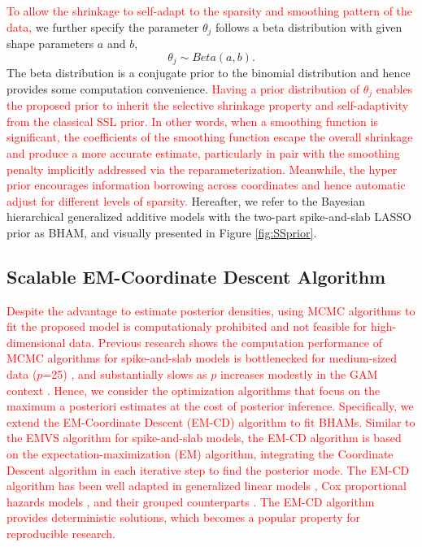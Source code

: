 \documentclass[AMA,STIX1COL,]{WileyNJD-v2}
\begin{document}
\textcolor{red}{To allow the shrinkage to self-adapt to the sparsity and smoothing pattern of the data, }we
further specify the parameter \(\theta_j\) follows a beta distribution
with given shape parameters \(a\) and \(b\), \[
\theta_j \sim Beta(a, b).
\] The beta distribution is a conjugate prior to the binomial
distribution and hence provides some computation convenience.
\textcolor{red}{Having a prior distribution of $\theta_j$ enables the proposed prior to inherit the selective shrinkage property and self-adaptivity \cite{Bai2021Review} from the classical SSL prior. In other words, when a smoothing function is significant, the coefficients of the smoothing function escape the overall shrinkage and produce a more accurate estimate, particularly in pair with the smoothing penalty implicitly addressed via the reparameterization. Meanwhile, the hyper prior encourages information borrowing across coordinates and hence automatic adjust for different levels of sparsity.}
Hereafter, we refer to the Bayesian hierarchical generalized additive
models with the two-part spike-and-slab LASSO prior as BHAM, and
visually presented in Figure \ref{fig:SSprior}.

\subsection{Scalable EM-Coordinate Descent Algorithm}

\textcolor{red}{Despite the advantage to estimate posterior densities, using MCMC algorithms to fit the proposed model is computationaly prohibited and not feasible for high-dimensional data. Previous research shows the computation performance of MCMC algorithms for spike-and-slab models is bottlenecked for medium-sized data ($p$=25) \cite{George1997}, and substantially slows as $p$ increases modestly in the GAM context \cite{Scheipl2013}. Hence, we consider the optimization algorithms that focus on the maximum a posteriori estimates at the cost of posterior inference. Specifically, we
extend the EM-Coordinate Descent (EM-CD) algorithm to fit BHAMs. Similar to the EMVS algorithm \cite{Rockova2014a} for spike-and-slab models, the EM-CD algorithm is based on the expectation-maximization (EM) algorithm, integrating the Coordinate Descent algorithm in each iterative step to find the posterior mode. The EM-CD algorithm has been well adapted in generalized linear models \cite{Tang2017a}, Cox proportional hazards models \cite{Tang2017}, and their grouped counterparts \cite{Tang2018, Tang2019}. The EM-CD algorithm provides deterministic solutions, which becomes a popular property for reproducible research.}
\end{document}
